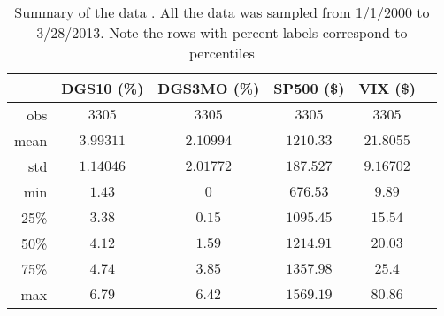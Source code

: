 \begin{table}[ht]
	\begin{center}
	\label{tab:describe}
		\begin{tabular}{r|ccccc}
		\toprule
			 & DGS10  (\%)& DGS3MO  (\%)& SP500 (\$)& VIX (\$)\\
			\midrule
			\midrule
			obs & $3305$ & $3305$ & $3305$ & $3305$\\
			mean & $3.99311$ & $2.10994$ & $1210.33$ & $21.8055$\\
			std & $1.14046$ & $2.01772$ & $187.527$ & $9.16702$\\
			min & $1.43$ & $0$ & $676.53$ & $9.89$\\
			25\% & $3.38$ & $0.15$ & $1095.45$ & $15.54$\\
			50\% & $4.12$ & $1.59$ & $1214.91$ & $20.03$\\
			75\% & $4.74$ & $3.85$ & $1357.98$ & $25.4$\\
			max & $6.79$ & $6.42$ & $1569.19$ & $80.86$\\
		\bottomrule
		\end{tabular}
		\caption{Summary of the data . All the data was sampled from 1/1/2000 to 3/28/2013. Note the rows with percent labels correspond to percentiles}
	\end{center}
\end{table}
